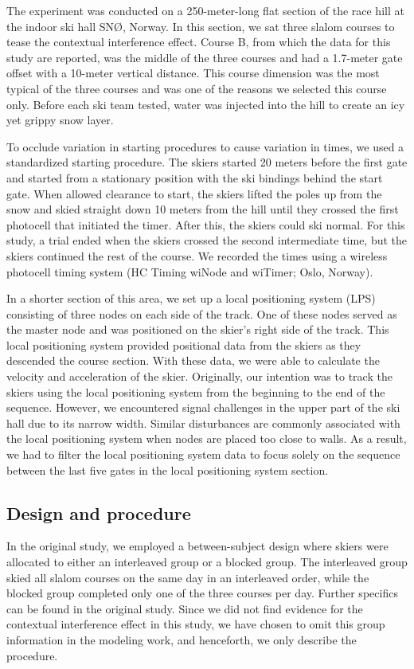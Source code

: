 \documentclass{article}
\begin{document}
The experiment was conducted on a 250-meter-long flat section of the race hill at the indoor ski hall SNØ, Norway. In this section, we sat three slalom courses to tease the contextual interference effect. Course B, from which the data for this study are reported, was the middle of the three courses and had a 1.7-meter gate offset with a 10-meter vertical distance. This course dimension was the most typical of the three courses and was one of the reasons we selected this course only. Before each ski team tested, water was injected into the hill to create an icy yet grippy snow layer.

To occlude variation in starting procedures to cause variation in times, we used a standardized starting procedure. The skiers started 20 meters before the first gate and started from a stationary position with the ski bindings behind the start gate. When allowed clearance to start, the skiers lifted the poles up from the snow and skied straight down 10 meters from the hill until they crossed the first photocell that initiated the timer. After this, the skiers could ski normal. For this study, a trial ended when the skiers crossed the second intermediate time, but the skiers continued the rest of the course. We recorded the times using a wireless photocell timing system (HC Timing wiNode and wiTimer; Oslo, Norway).

In a shorter section of this area, we set up a local positioning system (LPS) consisting of three nodes on each side of the track. One of these nodes served as the master node and was positioned on the skier's right side of the track. This local positioning system provided positional data from the skiers as they descended the course section. With these data, we were able to calculate the velocity and acceleration of the skier. Originally, our intention was to track the skiers using the local positioning system from the beginning to the end of the sequence. However, we encountered signal challenges in the upper part of the ski hall due to its narrow width. Similar disturbances are commonly associated with the local positioning system when nodes are placed too close to walls. As a result, we had to filter the local positioning system data to focus solely on the sequence between the last five gates in the local positioning system section.

\subsection{Design and procedure}
In the original study, we employed a between-subject design where skiers were allocated to either an interleaved group or a blocked group. The interleaved group skied all slalom courses on the same day in an interleaved order, while the blocked group completed only one of the three courses per day. Further specifics can be found in the original study. Since we did not find evidence for the contextual interference effect in this study, we have chosen to omit this group information in the modeling work, and henceforth, we only describe the procedure.
\end{document}
